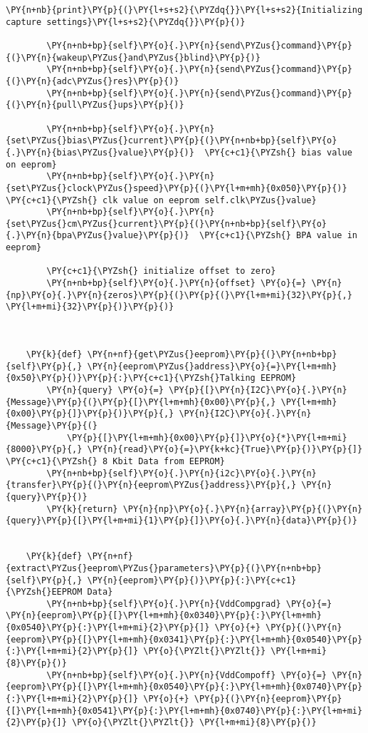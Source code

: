 \begin{tcolorbox}[breakable, size=fbox, boxrule=1pt, pad at break*=1mm,colback=cellbackground, colframe=cellborder]
\begin{Verbatim}[commandchars=\\\{\}]
		\PY{n+nb}{print}\PY{p}{(}\PY{l+s+s2}{\PYZdq{}}\PY{l+s+s2}{Initializing capture settings}\PY{l+s+s2}{\PYZdq{}}\PY{p}{)}

		\PY{n+nb+bp}{self}\PY{o}{.}\PY{n}{send\PYZus{}command}\PY{p}{(}\PY{n}{wakeup\PYZus{}and\PYZus{}blind}\PY{p}{)}
		\PY{n+nb+bp}{self}\PY{o}{.}\PY{n}{send\PYZus{}command}\PY{p}{(}\PY{n}{adc\PYZus{}res}\PY{p}{)}
		\PY{n+nb+bp}{self}\PY{o}{.}\PY{n}{send\PYZus{}command}\PY{p}{(}\PY{n}{pull\PYZus{}ups}\PY{p}{)}

		\PY{n+nb+bp}{self}\PY{o}{.}\PY{n}{set\PYZus{}bias\PYZus{}current}\PY{p}{(}\PY{n+nb+bp}{self}\PY{o}{.}\PY{n}{bias\PYZus{}value}\PY{p}{)}  \PY{c+c1}{\PYZsh{} bias value on eeprom}
		\PY{n+nb+bp}{self}\PY{o}{.}\PY{n}{set\PYZus{}clock\PYZus{}speed}\PY{p}{(}\PY{l+m+mh}{0x050}\PY{p}{)}  \PY{c+c1}{\PYZsh{} clk value on eeprom self.clk\PYZus{}value}
		\PY{n+nb+bp}{self}\PY{o}{.}\PY{n}{set\PYZus{}cm\PYZus{}current}\PY{p}{(}\PY{n+nb+bp}{self}\PY{o}{.}\PY{n}{bpa\PYZus{}value}\PY{p}{)}  \PY{c+c1}{\PYZsh{} BPA value in eeprom}

		\PY{c+c1}{\PYZsh{} initialize offset to zero}
		\PY{n+nb+bp}{self}\PY{o}{.}\PY{n}{offset} \PY{o}{=} \PY{n}{np}\PY{o}{.}\PY{n}{zeros}\PY{p}{(}\PY{p}{(}\PY{l+m+mi}{32}\PY{p}{,} \PY{l+m+mi}{32}\PY{p}{)}\PY{p}{)}



	\PY{k}{def} \PY{n+nf}{get\PYZus{}eeprom}\PY{p}{(}\PY{n+nb+bp}{self}\PY{p}{,} \PY{n}{eeprom\PYZus{}address}\PY{o}{=}\PY{l+m+mh}{0x50}\PY{p}{)}\PY{p}{:}\PY{c+c1}{\PYZsh{}Talking EEPROM}
		\PY{n}{query} \PY{o}{=} \PY{p}{[}\PY{n}{I2C}\PY{o}{.}\PY{n}{Message}\PY{p}{(}\PY{p}{[}\PY{l+m+mh}{0x00}\PY{p}{,} \PY{l+m+mh}{0x00}\PY{p}{]}\PY{p}{)}\PY{p}{,} \PY{n}{I2C}\PY{o}{.}\PY{n}{Message}\PY{p}{(}
		    \PY{p}{[}\PY{l+m+mh}{0x00}\PY{p}{]}\PY{o}{*}\PY{l+m+mi}{8000}\PY{p}{,} \PY{n}{read}\PY{o}{=}\PY{k+kc}{True}\PY{p}{)}\PY{p}{]}  \PY{c+c1}{\PYZsh{} 8 Kbit Data from EEPROM}
		\PY{n+nb+bp}{self}\PY{o}{.}\PY{n}{i2c}\PY{o}{.}\PY{n}{transfer}\PY{p}{(}\PY{n}{eeprom\PYZus{}address}\PY{p}{,} \PY{n}{query}\PY{p}{)}
		\PY{k}{return} \PY{n}{np}\PY{o}{.}\PY{n}{array}\PY{p}{(}\PY{n}{query}\PY{p}{[}\PY{l+m+mi}{1}\PY{p}{]}\PY{o}{.}\PY{n}{data}\PY{p}{)}


	\PY{k}{def} \PY{n+nf}{extract\PYZus{}eeprom\PYZus{}parameters}\PY{p}{(}\PY{n+nb+bp}{self}\PY{p}{,} \PY{n}{eeprom}\PY{p}{)}\PY{p}{:}\PY{c+c1}{\PYZsh{}EEPROM Data}
		\PY{n+nb+bp}{self}\PY{o}{.}\PY{n}{VddCompgrad} \PY{o}{=} \PY{n}{eeprom}\PY{p}{[}\PY{l+m+mh}{0x0340}\PY{p}{:}\PY{l+m+mh}{0x0540}\PY{p}{:}\PY{l+m+mi}{2}\PY{p}{]} \PY{o}{+} \PY{p}{(}\PY{n}{eeprom}\PY{p}{[}\PY{l+m+mh}{0x0341}\PY{p}{:}\PY{l+m+mh}{0x0540}\PY{p}{:}\PY{l+m+mi}{2}\PY{p}{]} \PY{o}{\PYZlt{}\PYZlt{}} \PY{l+m+mi}{8}\PY{p}{)}
		\PY{n+nb+bp}{self}\PY{o}{.}\PY{n}{VddCompoff} \PY{o}{=} \PY{n}{eeprom}\PY{p}{[}\PY{l+m+mh}{0x0540}\PY{p}{:}\PY{l+m+mh}{0x0740}\PY{p}{:}\PY{l+m+mi}{2}\PY{p}{]} \PY{o}{+} \PY{p}{(}\PY{n}{eeprom}\PY{p}{[}\PY{l+m+mh}{0x0541}\PY{p}{:}\PY{l+m+mh}{0x0740}\PY{p}{:}\PY{l+m+mi}{2}\PY{p}{]} \PY{o}{\PYZlt{}\PYZlt{}} \PY{l+m+mi}{8}\PY{p}{)}


\end{Verbatim}
\end{tcolorbox}
